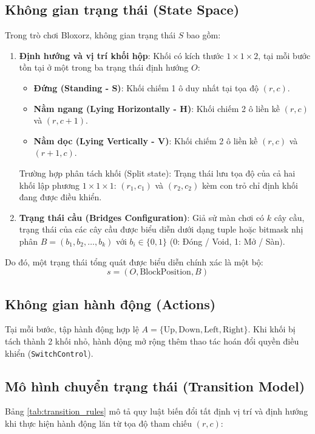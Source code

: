 \documentclass[12pt,a4paper]{article}
\begin{document}
\subsection{Không gian trạng thái (State Space)}
Trong trò chơi Bloxorz, không gian trạng thái $S$ bao gồm:
\begin{enumerate}
    \item \textbf{Định hướng và vị trí khối hộp}:
    Khối có kích thước $1 \times 1 \times 2$, tại mỗi bước tồn tại ở một trong ba trạng thái định hướng $O$:
    \begin{itemize}
        \item \textbf{Đứng (Standing - S)}: Khối chiếm 1 ô duy nhất tại tọa độ $(r, c)$.
        \item \textbf{Nằm ngang (Lying Horizontally - H)}: Khối chiếm 2 ô liền kề $(r, c)$ và $(r, c + 1)$.
        \item \textbf{Nằm dọc (Lying Vertically - V)}: Khối chiếm 2 ô liền kề $(r, c)$ và $(r + 1, c)$.
    \end{itemize}
    Trường hợp phân tách khối (Split state): Trạng thái lưu tọa độ của cả hai khối lập phương $1 \times 1 \times 1$: $(r_1, c_1)$ và $(r_2, c_2)$ kèm con trỏ chỉ định khối đang được điều khiển.
    
    \item \textbf{Trạng thái cầu (Bridges Configuration)}:
    Giả sử màn chơi có $k$ cây cầu, trạng thái của các cây cầu được biểu diễn dưới dạng tuple hoặc bitmask nhị phân $B = (b_1, b_2, \dots, b_k)$ với $b_i \in \{0, 1\}$ (0: Đóng / Void, 1: Mở / Sàn).
\end{enumerate}
Do đó, một trạng thái tổng quát được biểu diễn chính xác là một bộ:
\begin{equation}
    s = (O, \text{BlockPosition}, B)
\end{equation}

\subsection{Không gian hành động (Actions)}
Tại mỗi bước, tập hành động hợp lệ $A = \{\text{Up}, \text{Down}, \text{Left}, \text{Right}\}$. Khi khối bị tách thành 2 khối nhỏ, hành động mở rộng thêm thao tác hoán đổi quyền điều khiển (\texttt{SwitchControl}).

\subsection{Mô hình chuyển trạng thái (Transition Model)}
Bảng \ref{tab:transition_rules} mô tả quy luật biến đổi tất định vị trí và định hướng khi thực hiện hành động lăn từ tọa độ tham chiếu $(r, c)$:
\end{document}
